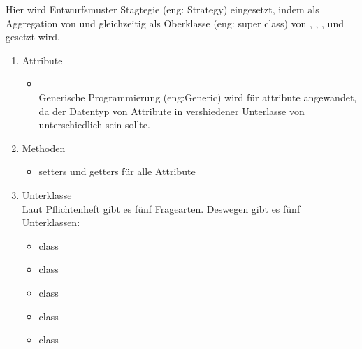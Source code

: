 \documentclass[a4paper]{scrreprt}
\begin{document}
                    Hier wird Entwurfsmuster Stagtegie (eng: Strategy) eingesetzt, indem  als Aggregation von  und gleichzeitig als Oberklasse (eng: super class) von , , ,  und  gesetzt wird.
                    \begin{enumerate}
                        \item Attribute
                            \begin{itemize}
                                \item {}\\
                                    Generische Programmierung (eng:Generic) wird für attribute  angewandet, da der Datentyp von Attribute  in vershiedener Unterlasse von  unterschiedlich sein sollte.
                            \end{itemize}
                        \item Methoden
                            \begin{itemize}
                                \item setters und getters für alle Attribute
                            \end{itemize}
                        \item Unterklasse\\
                            Laut Pflichtenheft gibt es fünf Fragearten. Deswegen gibt es fünf Unterklassen:
                            \begin{itemize}
                                \item class 
                                \item class 
                                \item class 
                                \item class 
                                \item class 
                            \end{itemize}
                    \end{enumerate}
\end{document}
